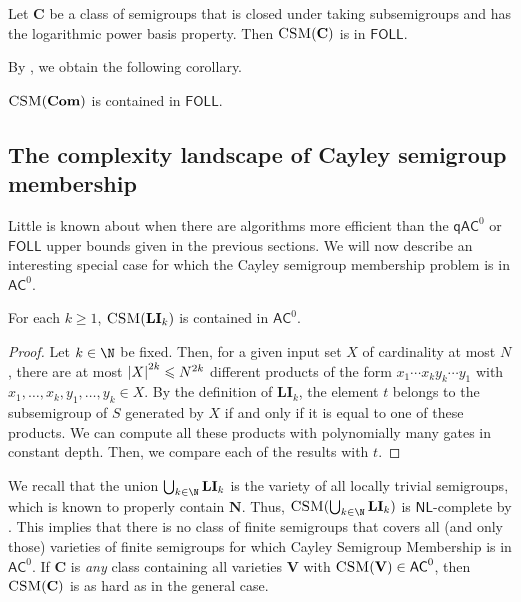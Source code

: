 \documentclass{toc}
\renewcommand{\geq}{\geqslant}
\renewcommand{\leq}{\leqslant}
\renewcommand{\ge}{\geq}
\renewcommand{\le}{\leq}
\newcommand{\abs}[1]{\ensuremath\left|#1\right|}
\newcommand{\FOLL}{\ensuremath{\mathsf{FOLL}}}
\newcommand{\AC}{\ensuremath{\mathsf{AC}}}
\newcommand{\qAC}{\ensuremath{\mathsf{qAC}}}
\newcommand{\NL}{\ensuremath{\mathsf{NL}}}
\newcommand{\vC}{\mathbf{C}}
\newcommand{\vV}{\mathbf{V}}
\newcommand{\vNil}{\mathbf{N}}
\newcommand{\vLI}{\mathbf{LI}}
\newcommand{\vCom}{\mathbf{Com}}
\newcommand{\CSM}{\ensuremath{\textsc{CSM}}}
\newcommand{\SCSM}{Cayley semigroup membership}
\newcommand{\CCSM}{Cayley Semigroup Membership}
\newcommand{\SCSMP}{{\SCSM} problem}
\newcommand{\SLPBP}{logarithmic power basis property}
\begin{document}
\begin{theorem}
  Let $\vC$ be a class of semigroups that is closed under taking subsemigroups
  and has the {\SLPBP}.
  Then $\CSM(\vC)$ is in $\FOLL$.
  \label{thm:FOLL}
\end{theorem}

By , we obtain the following corollary.

\begin{corollary}
  $\CSM(\vCom)$ is contained in $\FOLL$.
  \label{thm:Com-FOLL}
\end{corollary}

%
\subsection{The complexity landscape of {\SCSM}}  %

Little is known about when there are algorithms more efficient than the
$\qAC^0$ or $\FOLL$ upper bounds given in the previous sections.
%
We will now describe an interesting special case for which the
{\SCSMP} is in $\AC^0$.

\begin{theorem}
  For each $k \ge 1$, $\CSM(\vLI_k)$ is contained in $\AC^0$.
\end{theorem}
%
\begin{proof}
  Let $k \in \N$ be fixed.
  Then, for a given input set $X$ of cardinality at most $N$, there are at most
  $\abs{X}^{2k} \le N^{2k}$ different products of the form $x_1 \cdots x_k y_k
  \cdots y_1$ with $x_1, \dots, x_k, y_1, \dots, y_k \in X$.
  By the definition of $\vLI_k$, the element $t$ belongs to the subsemigroup
  of $S$ generated by $X$ if and only if it is equal to one of these products.
  We can compute all these products with polynomially many gates in constant
  depth. Then, we compare each of the results with $t$.
\end{proof}

We recall that the union $\bigcup_{k \in \N} \vLI_k$ is the variety of all
{locally trivial semigroups}, which is known to properly contain $\vNil$. Thus,
$\CSM(\bigcup_{k \in \N} \vLI_k)$ is $\NL$-complete by .
%
This implies that there is no class of finite semigroups that covers all (and
only those) varieties of finite semigroups for which {\CCSM} is in $\AC^0$.  If
$\vC$ is \emph{any} class containing all varieties $\vV$ with $\CSM(\vV) \in
\AC^0$, then $\CSM(\vC)$ is as hard as in the general case.
\end{document}
